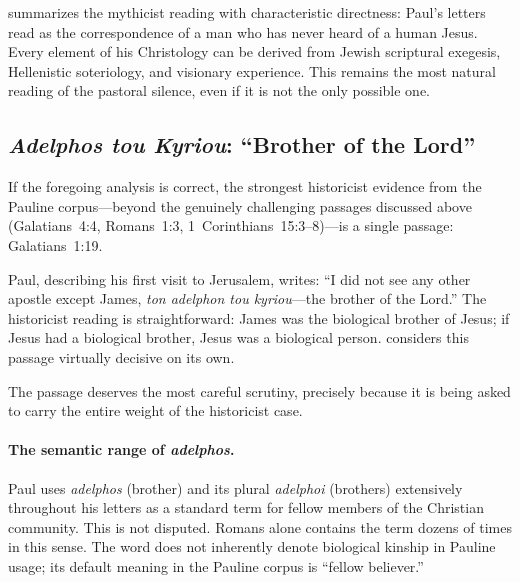 \documentclass[12pt,oneside]{article}
\newcommand{\grk}[1]{\textit{#1}}   %
\begin{document}
\citet{Doherty2009} summarizes the mythicist reading with characteristic
directness: Paul's letters read as the correspondence of a man who has
never heard of a human Jesus.  Every element of his Christology can be
derived from Jewish scriptural exegesis, Hellenistic soteriology, and
visionary experience.  This remains the most natural reading of the
pastoral silence, even if it is not the only possible one.

\subsection{\grk{Adelphos tou Kyriou}: ``Brother of the Lord''}
\label{sec:paul:brother}

If the foregoing analysis is correct, the strongest historicist evidence
from the Pauline corpus---beyond the genuinely challenging passages
discussed above (Galatians~4:4, Romans~1:3, 1~Corinthians~15:3--8)---is
a single passage: Galatians~1:19.

Paul, describing his first visit to Jerusalem, writes: ``I did not see
any other apostle except James, \grk{ton adelphon tou kyriou}---the
brother of the Lord.''  The historicist reading is straightforward: James
was the biological brother of Jesus; if Jesus had a biological brother,
Jesus was a biological person.  \citet{Ehrman2012} considers this
passage virtually decisive on its own.

The passage deserves the most careful scrutiny, precisely because it is
being asked to carry the entire weight of the historicist case.

\paragraph{The semantic range of \grk{adelphos}.}
Paul uses \grk{adelphos} (brother) and its plural \grk{adelphoi}
(brothers) extensively throughout his letters as a standard term for
fellow members of the Christian community.  This is not disputed.
Romans alone contains the term dozens of times in this sense.  The word
does not inherently denote biological kinship in Pauline usage; its
default meaning in the Pauline corpus is ``fellow believer.''
\end{document}
